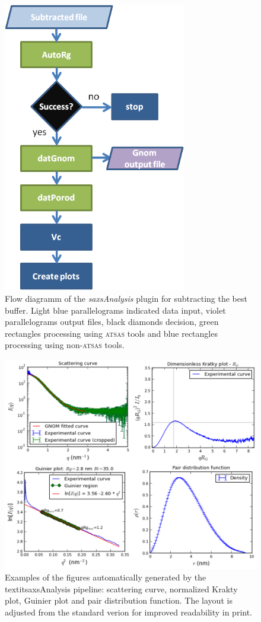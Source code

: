 \documentclass[preprint,pdf]{iucr}              %
\begin{document}
\begin{figure}
\centering
\includegraphics[width=8cm]{analysis.png}%
\caption{Flow diagramm of the \textit{saxsAnalysis} plugin for subtracting the best buffer. Light blue parallelograms indicated data input, violet  parallelograms output files, black diamonds decision, green rectangles processing using \textsc{atsas} tools and blue rectangles processing using non-\textsc{atsas} tools. }
\label{fgr:analysis}
\end{figure}

\begin{figure}
\centering
\includegraphics[width=18cm]{autoplot.png}%
\caption{Examples of the figures automatically generated by the textit{saxsAnalysis} pipeline: scattering curve, normalized Krakty plot, Guinier plot and pair distribution function. The layout is adjusted from the standard verion for improved readability in print.}
\label{plots}
\end{figure}
\end{document}
